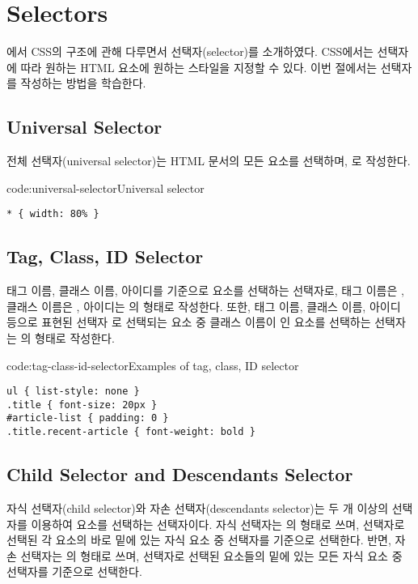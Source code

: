 \section{Selectors}\label{sect:selectors}

에서 CSS의 구조에 관해 다루면서 선택자(selector)를 소개하였다. CSS에서는 선택자에 따라 원하는 HTML 요소에 원하는 스타일을 지정할 수 있다. 이번 절에서는 선택자를 작성하는 방법을 학습한다.

\subsection*{Universal Selector}

전체 선택자(universal selector)는 HTML 문서의 모든 요소를 선택하며, \cd{*}로 작성한다.

\begin{code}{code:universal-selector}{Universal selector}
\begin{verbatim}
* { width: 80% }
\end{verbatim}
\end{code}

\subsection*{Tag, Class, ID Selector}
태그 이름, 클래스 이름, 아이디를 기준으로 요소를 선택하는 선택자로, 태그 이름은 , 클래스 이름은 , 아이디는 의 형태로 작성한다. 또한, 태그 이름, 클래스 이름, 아이디 등으로 표현된 선택자 로 선택되는 요소 중 클래스 이름이 인 요소를 선택하는 선택자는 의 형태로 작성한다.

\begin{code}{code:tag-class-id-selector}{Examples of tag, class, ID selector}
\begin{verbatim}
ul { list-style: none }
.title { font-size: 20px }
#article-list { padding: 0 }
.title.recent-article { font-weight: bold }
\end{verbatim}
\end{code}

\subsection*{Child Selector and Descendants Selector}

자식 선택자(child selector)와 자손 선택자(descendants selector)는 두 개 이상의 선택자를 이용하여 요소를 선택하는 선택자이다. 자식 선택자는 의 형태로 쓰며,  선택자로 선택된 각 요소의 바로 밑에 있는 자식 요소 중  선택자를 기준으로 선택한다. 반면, 자손 선택자는 의 형태로 쓰며,  선택자로 선택된 요소들의 밑에 있는 모든 자식 요소 중  선택자를 기준으로 선택한다.

